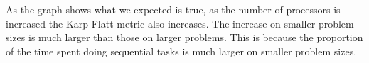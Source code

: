 \documentclass{article}
\begin{document}
As the graph shows what we expected is true, as the number of processors is increased
the Karp-Flatt metric also increases. The increase on smaller problem sizes is much
larger than those on larger problems. This is because the proportion of the time
spent doing sequential tasks is much larger on smaller problem sizes.
\end{document}
